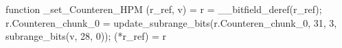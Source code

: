 function _set_Counteren_HPM (r_ref, v) = {
    r = __bitfield_deref(r_ref);
    r.Counteren_chunk_0 = update_subrange_bits(r.Counteren_chunk_0, 31, 3, subrange_bits(v, 28, 0));
    (*r_ref) = r
}
